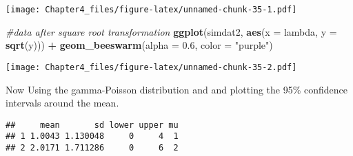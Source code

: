 \documentclass[]{article}
\newenvironment{Shaded}{\begin{snugshade}}{\end{snugshade}}
\newcommand{\CommentTok}[1]{\textcolor[rgb]{0.56,0.35,0.01}{\textit{#1}}}
\newcommand{\ControlFlowTok}[1]{\textcolor[rgb]{0.13,0.29,0.53}{\textbf{#1}}}
\newcommand{\DataTypeTok}[1]{\textcolor[rgb]{0.13,0.29,0.53}{#1}}
\newcommand{\DecValTok}[1]{\textcolor[rgb]{0.00,0.00,0.81}{#1}}
\newcommand{\FloatTok}[1]{\textcolor[rgb]{0.00,0.00,0.81}{#1}}
\newcommand{\KeywordTok}[1]{\textcolor[rgb]{0.13,0.29,0.53}{\textbf{#1}}}
\newcommand{\NormalTok}[1]{#1}
\newcommand{\OperatorTok}[1]{\textcolor[rgb]{0.81,0.36,0.00}{\textbf{#1}}}
\newcommand{\StringTok}[1]{\textcolor[rgb]{0.31,0.60,0.02}{#1}}
\begin{document}
\texttt{[image: Chapter4\_files/figure-latex/unnamed-chunk-35-1.pdf]}

\begin{Shaded}
\begin{Highlighting}[]
\CommentTok{#data after square root transformation}
\KeywordTok{ggplot}\NormalTok{(simdat2, }\KeywordTok{aes}\NormalTok{(}\DataTypeTok{x =}\NormalTok{ lambda, }\DataTypeTok{y =} \KeywordTok{sqrt}\NormalTok{(y))) }\OperatorTok{+}
\StringTok{  }\KeywordTok{geom_beeswarm}\NormalTok{(}\DataTypeTok{alpha =} \FloatTok{0.6}\NormalTok{, }\DataTypeTok{color =} \StringTok{"purple"}\NormalTok{)}
\end{Highlighting}
\end{Shaded}

\texttt{[image: Chapter4\_files/figure-latex/unnamed-chunk-35-2.pdf]}

Now Using the gamma-Poisson distribution and and plotting the 95\%
confidence intervals around the mean.

\begin{Shaded}
\end{Shaded}

\begin{verbatim}
##     mean       sd lower upper mu
## 1 1.0043 1.130048     0     4  1
## 2 2.0171 1.711286     0     6  2
\end{verbatim}
\end{document}

